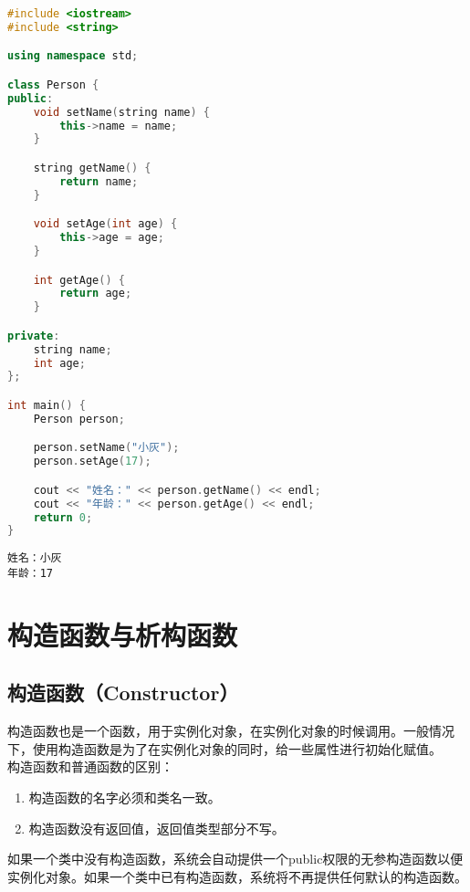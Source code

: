 \begin{lstlisting}[language=C++]
#include <iostream>
#include <string>

using namespace std;

class Person {
public:
    void setName(string name) {
        this->name = name;
    }

    string getName() {
        return name;
    }

    void setAge(int age) {
        this->age = age;
    }

    int getAge() {
        return age;
    }

private:
    string name;
    int age;
};

int main() {
    Person person;

    person.setName("小灰");
    person.setAge(17);

    cout << "姓名：" << person.getName() << endl;
    cout << "年龄：" << person.getAge() << endl;
    return 0;
}
\end{lstlisting}

\begin{tcolorbox}
	\begin{verbatim}
姓名：小灰
年龄：17
	\end{verbatim}
\end{tcolorbox}

\newpage

\section{构造函数与析构函数}

\subsection{构造函数（Constructor）}

构造函数也是一个函数，用于实例化对象，在实例化对象的时候调用。一般情况下，使用构造函数是为了在实例化对象的同时，给一些属性进行初始化赋值。\\

构造函数和普通函数的区别：

\begin{enumerate}
	\item 构造函数的名字必须和类名一致。
	\item 构造函数没有返回值，返回值类型部分不写。
\end{enumerate}

如果一个类中没有构造函数，系统会自动提供一个public权限的无参构造函数以便实例化对象。如果一个类中已有构造函数，系统将不再提供任何默认的构造函数。\\

